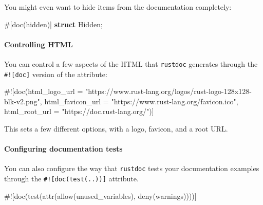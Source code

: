 \documentclass[a4paper,]{book}
\newenvironment{Shaded}{\begin{snugshade}}{\end{snugshade}}
\newcommand{\KeywordTok}[1]{\textcolor[rgb]{0.13,0.29,0.53}{\textbf{{#1}}}}
\newcommand{\StringTok}[1]{\textcolor[rgb]{0.31,0.60,0.02}{{#1}}}
\newcommand{\AttributeTok}[1]{\textcolor[rgb]{0.77,0.63,0.00}{{#1}}}
\newcommand{\NormalTok}[1]{{#1}}
\let\oldparagraph\paragraph
\renewcommand{\paragraph}[1]{\oldparagraph{#1}\mbox{}}
\begin{document}
You might even want to hide items from the documentation completely:

\begin{Shaded}
\begin{Highlighting}[]
\AttributeTok{#[}\NormalTok{doc}\AttributeTok{(}\NormalTok{hidden}\AttributeTok{)]}
\KeywordTok{struct} \NormalTok{Hidden;}
\end{Highlighting}
\end{Shaded}

\paragraph{Controlling HTML}\label{controlling-html}

You can control a few aspects of the HTML that \texttt{rustdoc}
generates through the \texttt{\#!{[}doc{]}} version of the attribute:

\begin{Shaded}
\begin{Highlighting}[]
\AttributeTok{#![}\NormalTok{doc}\AttributeTok{(}\NormalTok{html_logo_url }\AttributeTok{=} \StringTok{"https://www.rust-lang.org/logos/rust-logo-128x128-blk-v2.png"}\AttributeTok{,}
       \NormalTok{html_favicon_url }\AttributeTok{=} \StringTok{"https://www.rust-lang.org/favicon.ico"}\AttributeTok{,}
       \NormalTok{html_root_url }\AttributeTok{=} \StringTok{"https://doc.rust-lang.org/"}\AttributeTok{)]}
\end{Highlighting}
\end{Shaded}

This sets a few different options, with a logo, favicon, and a root URL.

\paragraph{Configuring documentation
tests}\label{configuring-documentation-tests}

You can also configure the way that \texttt{rustdoc} tests your
documentation examples through the \texttt{\#!{[}doc(test(..)){]}}
attribute.

\begin{Shaded}
\begin{Highlighting}[]
\AttributeTok{#![}\NormalTok{doc}\AttributeTok{(}\NormalTok{test}\AttributeTok{(}\NormalTok{attr}\AttributeTok{(}\NormalTok{allow}\AttributeTok{(}\NormalTok{unused_variables}\AttributeTok{),} \NormalTok{deny}\AttributeTok{(}\NormalTok{warnings}\AttributeTok{))))]}
\end{Highlighting}
\end{Shaded}
\end{document}
